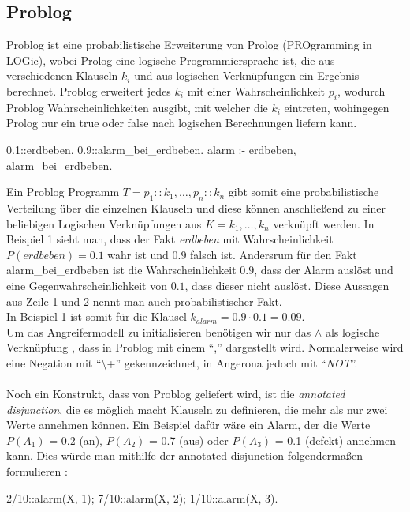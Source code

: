 \documentclass[german,version-2020-11]{uzl-thesis}
\begin{document}
\subsection{Problog}
Problog ist eine probabilistische Erweiterung von Prolog (PROgramming in LOGic), wobei Prolog eine logische Programmiersprache ist, die aus verschiedenen Klauseln $k_i$ und aus logischen Verknüpfungen ein Ergebnis berechnet. Problog erweitert jedes $k_i$ mit einer Wahrscheinlichkeit $p_i$, wodurch Problog  Wahrscheinlichkeiten ausgibt, mit welcher die $k_i$ eintreten, wohingegen Prolog nur ein true oder false nach logischen Berechnungen liefern kann. 
\begin{Pseudocode}[caption={Beispiel Problog Programm}, label={lst-1}, numbers=left]
0.1::erdbeben.
0.9::alarm_bei_erdbeben.
alarm :- erdbeben, alarm_bei_erdbeben.
\end{Pseudocode} 
Ein Problog Programm $T = {p_1 :: k_1, \dots, p_n :: k_n}$ gibt somit eine probabilistische Verteilung über die einzelnen Klauseln und diese können anschließend zu einer beliebigen Logischen Verknüpfungen aus $K = {k_1 , \dots , k_n}$ verknüpft werden. In Beispiel 1 sieht man, dass der Fakt \textit{erdbeben} mit Wahrscheinlichkeit $ P(erdbeben) = 0.1$ wahr ist und $0.9$ falsch ist. Andersrum für den Fakt alarm\_bei\_erdbeben ist die Wahrscheinlichkeit $0.9$, dass der Alarm auslöst und eine Gegenwahrscheinlichkeit von $0.1$, dass dieser nicht auslöst. Diese Aussagen aus Zeile 1 und 2 nennt man auch probabilistischer Fakt.\\  In Beispiel 1 ist somit für die Klausel $k_{alarm} = 0.9 \cdot 0.1 = 0.09  $. \cite{4}\cite{5} \\ 
Um das Angreifermodell zu initialisieren benötigen wir nur das $\land$ als logische Verknüpfung , dass in Problog mit einem \enquote{,} dargestellt wird. Normalerweise wird eine Negation mit \enquote{\textbackslash+} gekennzeichnet, in Angerona jedoch mit \enquote{\textit{NOT}}.\\ \\
Noch ein Konstrukt, dass von Problog geliefert wird, ist die \textit{annotated disjunction}, die es möglich macht Klauseln zu definieren, die mehr als nur zwei Werte annehmen können. Ein Beispiel dafür wäre ein Alarm, der die Werte $P(A_1)$ = 0.2 (an), $P(A_2)$ = 0.7 (aus) oder $P(A_3)$ = 0.1 (defekt) annehmen kann. Dies würde man mithilfe der annotated disjunction folgendermaßen formulieren : 
\begin{Pseudocode}
2/10::alarm(X, 1); 7/10::alarm(X, 2); 1/10::alarm(X, 3).
\end{Pseudocode}
\end{document}
